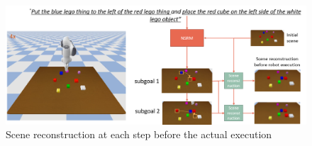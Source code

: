 \begin{figure}
    \centering
    \includegraphics[width=\textwidth]{assets/recons-steps.png}
    \caption{Scene reconstruction at each step before the actual execution}
    \label{fig:recons-steps}
\end{figure}


